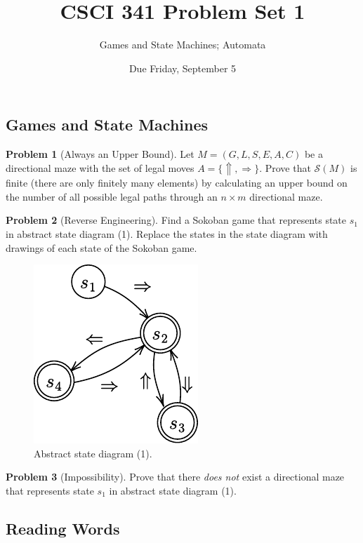 \documentclass[11pt]{article}
\title{CSCI 341 Problem Set 1}
\author{Games and State Machines; Automata}
\date{Due
    Friday, September 5
}
\theoremstyle{theorem} %
\theoremstyle{definition} %
\newtheorem{problem}                    {{\color{BurntOrange}Problem}}
\theoremstyle{remark} %
\begin{document}
\maketitle

\subsection*{Games and State Machines}

\begin{problem}
    [Always an Upper Bound]
    Let \(M = (G, L, S, E, A, C)\) be a directional maze with the set of legal moves \(A = \{\Uparrow, \Rightarrow\}\).
    Prove that \(\mathcal S(M)\) is finite (there are only finitely many elements) by calculating an upper bound on the number of all possible legal paths through an \(n\times m\) directional maze.
\end{problem}

\begin{problem}
    [Reverse Engineering]
    Find a Sokoban game that represents state \(s_1\) in abstract state diagram (1).
    Replace the states in the state diagram with drawings of each state of the Sokoban game.

    \begin{figure}[h]
        \centering
        \includegraphics{../imgs/reverseengineering.pdf}
        \caption{Abstract state diagram (1).}
    \end{figure}
\end{problem}

\begin{problem}
    [Impossibility]
    Prove that there \emph{does not} exist a directional maze that represents state \(s_1\) in abstract state diagram (1).
\end{problem}

\subsection*{Reading Words}
\end{document}

